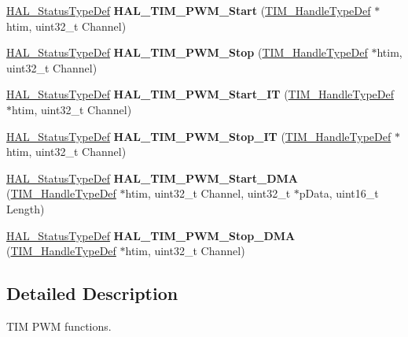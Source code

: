 \begin{DoxyCompactItemize}
\mbox{\hyperlink{stm32f7xx__hal__def_8h_a63c0679d1cb8b8c684fbb0632743478f}{H\+A\+L\+\_\+\+Status\+Type\+Def}} {\bfseries H\+A\+L\+\_\+\+T\+I\+M\+\_\+\+P\+W\+M\+\_\+\+Start} (\mbox{\hyperlink{struct_t_i_m___handle_type_def}{T\+I\+M\+\_\+\+Handle\+Type\+Def}} $\ast$htim, uint32\+\_\+t Channel)
\item 
\mbox{\label{group___t_i_m___exported___functions___group3_gae087011858379feeb770ecb4568829d3}} 
\mbox{\hyperlink{stm32f7xx__hal__def_8h_a63c0679d1cb8b8c684fbb0632743478f}{H\+A\+L\+\_\+\+Status\+Type\+Def}} {\bfseries H\+A\+L\+\_\+\+T\+I\+M\+\_\+\+P\+W\+M\+\_\+\+Stop} (\mbox{\hyperlink{struct_t_i_m___handle_type_def}{T\+I\+M\+\_\+\+Handle\+Type\+Def}} $\ast$htim, uint32\+\_\+t Channel)
\item 
\mbox{\label{group___t_i_m___exported___functions___group3_gaca1f5fbc35101d0fc7e8af31c9a0c26c}} 
\mbox{\hyperlink{stm32f7xx__hal__def_8h_a63c0679d1cb8b8c684fbb0632743478f}{H\+A\+L\+\_\+\+Status\+Type\+Def}} {\bfseries H\+A\+L\+\_\+\+T\+I\+M\+\_\+\+P\+W\+M\+\_\+\+Start\+\_\+\+IT} (\mbox{\hyperlink{struct_t_i_m___handle_type_def}{T\+I\+M\+\_\+\+Handle\+Type\+Def}} $\ast$htim, uint32\+\_\+t Channel)
\item 
\mbox{\label{group___t_i_m___exported___functions___group3_ga0559af125dc5fb2bb183a6a4b86808b5}} 
\mbox{\hyperlink{stm32f7xx__hal__def_8h_a63c0679d1cb8b8c684fbb0632743478f}{H\+A\+L\+\_\+\+Status\+Type\+Def}} {\bfseries H\+A\+L\+\_\+\+T\+I\+M\+\_\+\+P\+W\+M\+\_\+\+Stop\+\_\+\+IT} (\mbox{\hyperlink{struct_t_i_m___handle_type_def}{T\+I\+M\+\_\+\+Handle\+Type\+Def}} $\ast$htim, uint32\+\_\+t Channel)
\item 
\mbox{\label{group___t_i_m___exported___functions___group3_gaa4b542b3c0ae347ea580c9e7c8e88b17}} 
\mbox{\hyperlink{stm32f7xx__hal__def_8h_a63c0679d1cb8b8c684fbb0632743478f}{H\+A\+L\+\_\+\+Status\+Type\+Def}} {\bfseries H\+A\+L\+\_\+\+T\+I\+M\+\_\+\+P\+W\+M\+\_\+\+Start\+\_\+\+D\+MA} (\mbox{\hyperlink{struct_t_i_m___handle_type_def}{T\+I\+M\+\_\+\+Handle\+Type\+Def}} $\ast$htim, uint32\+\_\+t Channel, uint32\+\_\+t $\ast$p\+Data, uint16\+\_\+t Length)
\item 
\mbox{\label{group___t_i_m___exported___functions___group3_gad77367f9b8d8d17842a913f7d6ce274b}} 
\mbox{\hyperlink{stm32f7xx__hal__def_8h_a63c0679d1cb8b8c684fbb0632743478f}{H\+A\+L\+\_\+\+Status\+Type\+Def}} {\bfseries H\+A\+L\+\_\+\+T\+I\+M\+\_\+\+P\+W\+M\+\_\+\+Stop\+\_\+\+D\+MA} (\mbox{\hyperlink{struct_t_i_m___handle_type_def}{T\+I\+M\+\_\+\+Handle\+Type\+Def}} $\ast$htim, uint32\+\_\+t Channel)
\end{DoxyCompactItemize}


\subsection{Detailed Description}
T\+IM P\+WM functions. 

